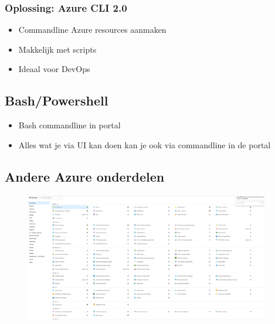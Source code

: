 \documentclass{article}
\begin{document}
\subsubsection{Oplossing: Azure CLI 2.0}
\begin{itemize}
    \item Commandline Azure resources aanmaken
    \item Makkelijk met scripts
    \item Ideaal voor DevOps
\end{itemize}

\subsection{Bash/Powershell}

\begin{itemize}
    \item Bash commandline in portal
    \item Alles wat je via UI kan doen kan je ook via commandline in de portal
\end{itemize}

\subsection{Andere Azure onderdelen}
\begin{figure}[H]
    \centering
    \includegraphics[width=0.95\textwidth]{azure-onderdelen.png}
    \caption{}
\end{figure}
\end{document}
